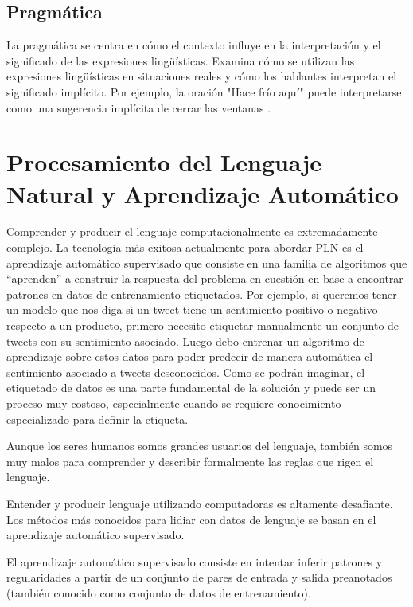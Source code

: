 \documentclass{book}
\begin{document}
\subsection{Pragmática}

La pragmática se centra en cómo el contexto influye en la interpretación y el significado de las expresiones lingüísticas. Examina cómo se utilizan las expresiones lingüísticas en situaciones reales y cómo los hablantes interpretan el significado implícito. Por ejemplo, la oración "Hace frío aquí" puede interpretarse como una sugerencia implícita de cerrar las ventanas \cite{fromkin2018introduction}.


\section{Procesamiento del Lenguaje Natural y Aprendizaje Automático}

Comprender y producir el lenguaje computacionalmente es extremadamente complejo.  La tecnología más exitosa actualmente para abordar PLN es el aprendizaje automático supervisado que consiste en una familia de algoritmos que “aprenden” a construir la respuesta del problema en cuestión en base a encontrar patrones en datos de entrenamiento etiquetados. Por ejemplo, si queremos tener un modelo que nos diga si un tweet tiene un sentimiento positivo o negativo respecto a un producto, primero necesito  etiquetar manualmente un conjunto de tweets con su sentimiento asociado. Luego debo entrenar un algoritmo de aprendizaje sobre estos datos para poder predecir de manera automática el sentimiento asociado a tweets desconocidos. Como se podrán imaginar, el etiquetado de datos es una parte fundamental de la solución y puede ser un proceso muy costoso, especialmente cuando se requiere conocimiento especializado para definir la etiqueta.

Aunque los seres humanos somos grandes usuarios del lenguaje, también somos muy malos para comprender y describir formalmente las reglas que rigen el lenguaje.

Entender y producir lenguaje utilizando computadoras es altamente desafiante. Los métodos más conocidos para lidiar con datos de lenguaje se basan en el aprendizaje automático supervisado.

El aprendizaje automático supervisado consiste en intentar inferir patrones y regularidades a partir de un conjunto de pares de entrada y salida preanotados (también conocido como conjunto de datos de entrenamiento).
\end{document}
